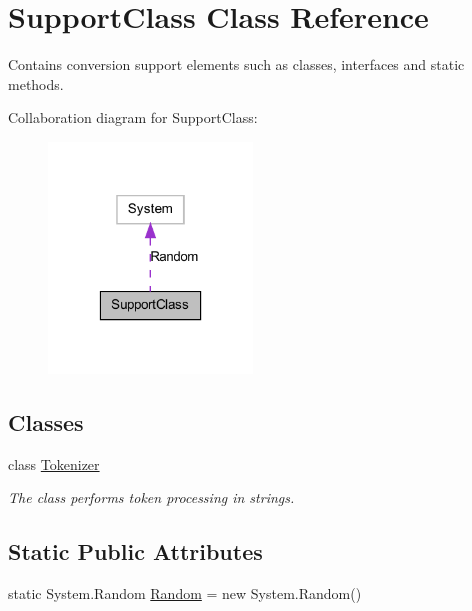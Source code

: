 \hypertarget{class_support_class}{
\section{SupportClass Class Reference}
\label{class_support_class}
}


Contains conversion support elements such as classes, interfaces and static methods.  




Collaboration diagram for SupportClass:
\nopagebreak
\begin{figure}[H]
\begin{center}
\leavevmode
\includegraphics[width=154pt]{class_support_class__coll__graph}
\end{center}
\end{figure}
\subsection*{Classes}
\begin{DoxyCompactItemize}
\item 
class \hyperlink{class_support_class_1_1_tokenizer}{Tokenizer}
\begin{DoxyCompactList}\small\item\em The class performs token processing in strings. \item\end{DoxyCompactList}\end{DoxyCompactItemize}
\subsection*{Static Public Attributes}
\begin{DoxyCompactItemize}
\item 
static System.Random \hyperlink{class_support_class_a400708a790aaf598353d65616255452d}{Random} = new System.Random()
\end{DoxyCompactItemize}


